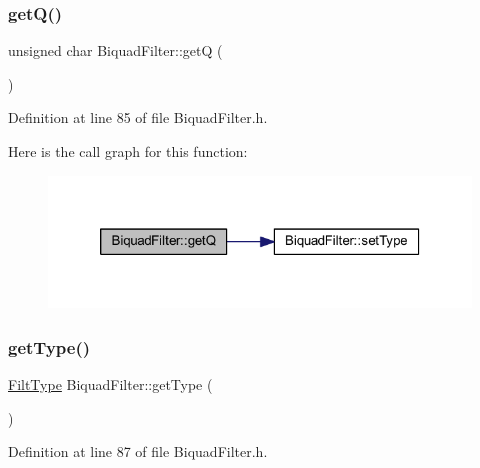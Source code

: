 \subsubsection{\texorpdfstring{get\+Q()}{getQ()}}
{\footnotesize\ttfamily unsigned char Biquad\+Filter\+::getQ (\begin{DoxyParamCaption}{ }\end{DoxyParamCaption})\hspace{0.3cm}{\ttfamily [inline]}}



Definition at line 85 of file Biquad\+Filter.\+h.

Here is the call graph for this function\+:
\nopagebreak
\begin{figure}[H]
\begin{center}
\leavevmode
\includegraphics[width=320pt]{class_biquad_filter_a579a1df530fc036f7d8a28e38b1f760c_cgraph}
\end{center}
\end{figure}
\mbox{\label{class_biquad_filter_ad77052398310ede2df2ba664259317d9}} 
\subsubsection{\texorpdfstring{get\+Type()}{getType()}}
{\footnotesize\ttfamily \hyperlink{class_biquad_filter_a173337ea2d17607e19495cf7b91f1110}{Filt\+Type} Biquad\+Filter\+::get\+Type (\begin{DoxyParamCaption}{ }\end{DoxyParamCaption})\hspace{0.3cm}{\ttfamily [inline]}}



Definition at line 87 of file Biquad\+Filter.\+h.

